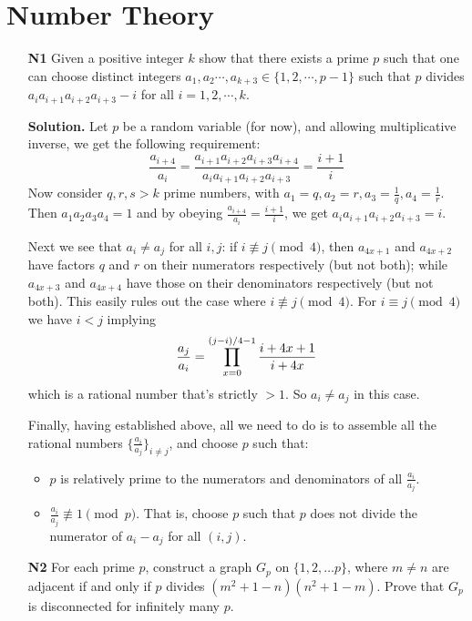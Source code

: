 \documentclass[11pt,a4paper]{article}
\begin{document}
\section*{Number Theory}
\begin{enumerate}
	\item[\textbf{N1}]
	Given a positive integer $k$ show that there exists a prime $p$ such that one can choose distinct integers $a_1,a_2\cdots, a_{k+3} \in \{1, 2, \cdots ,p-1\}$ such that $p$ divides $a_ia_{i+1}a_{i+2}a_{i+3}-i$ for all $i= 1, 2, \cdots, k$.
	
	\textbf{Solution.} 
	Let $p$ be a random variable (for now), and allowing multiplicative inverse, we get the following requirement: 
	\[
	\frac{a_{i+4}}{a_i}=\frac{a_{i+1}a_{i+2}a_{i+3}a_{i+4}}{a_ia_{i+1}a_{i+2}a_{i+3}} = \frac{i+1}{i}
	\]
	Now consider $q, r, s>k$ prime numbers, with $a_1=q, a_2=r, a_3=\frac{1}{q}, a_4 = \frac{1}{r}$. 
	Then $a_1a_2a_3a_4=1$ and by obeying $\frac{a_{i+4}}{a_i}=\frac{i+1}{i}$, we get $a_{i}a_{i+1}a_{i+2}a_{i+3}=i$. 
	
	Next we see that $a_i\neq a_j$ for all $i, j$: 
	if $i\not\equiv j\pmod{4}$, then $a_{4x+1}$ and $a_{4x+2}$ have factors $q$ and $r$ on their numerators respectively (but not both); while $a_{4x+3}$ and $a_{4x+4}$ have those on their denominators respectively (but not both). 
	This easily rules out the case where $i\not\equiv j\pmod{4}$. 
	For $i\equiv j\pmod{4}$ we have $i<j$ implying 
	\[
	\frac{a_j}{a_i}=\displaystyle\prod_{x=0}^{(j-i)/4-1}\frac{i+4x+1}{i+4x}
	\]
	which is a rational number that's strictly $>1$. 
	So $a_i\neq a_j$ in this case. 
	
	Finally, having established above, all we need to do is to assemble all the rational numbers $\{\frac{a_i}{a_j}\}_{i\neq j}$, and choose $p$ such that: 
	\begin{itemize}
		\item $p$ is relatively prime to the numerators and denominators of all $\frac{a_i}{a_j}$. 
		
		\item $\frac{a_i}{a_j}\not\equiv 1\pmod{p}$. That is, choose $p$ such that $p$ does not divide the numerator of $a_i-a_j$ for all $(i, j)$. 
	\end{itemize}
	
	\item[\textbf{N2}] For each prime $p$, construct a graph $G_p$ on $\{1,2,\ldots p\}$, where $m\neq n$ are adjacent if and only if $p$ divides $(m^{2} + 1-n)(n^{2} + 1-m)$. Prove that $G_p$ is disconnected for infinitely many $p$. 
	

\end{enumerate}
\end{document}
